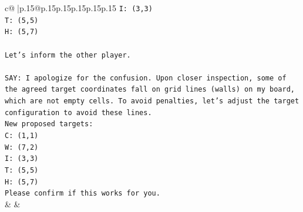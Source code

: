 \documentclass{article}
\begin{document}
{\begin{supertabular}{c@{$\;$}|p{.15\linewidth}@{}p{.15\linewidth}p{.15\linewidth}p{.15\linewidth}p{.15\linewidth}p{.15\linewidth}}
{{{\texttt{I: (3,3)} \\
\texttt{T: (5,5)} \\
\texttt{H: (5,7)} \\
\\ 
\texttt{Let's inform the other player.} \\
\\ 
\texttt{SAY: I apologize for the confusion. Upon closer inspection, some of the agreed target coordinates fall on grid lines (walls) on my board, which are not empty cells. To avoid penalties, let's adjust the target configuration to avoid these lines.} \\
\texttt{New proposed targets:} \\
\texttt{C: (1,1)} \\
\texttt{W: (7,2)} \\
\texttt{I: (3,3)} \\
\texttt{T: (5,5)} \\
\texttt{H: (5,7)} \\
\texttt{Please confirm if this works for you.} \\
            }
        }
    }
    & & \\ \\


\end{supertabular}}
\end{document}

